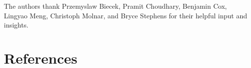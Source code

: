 \documentclass{article}
\begin{document}
The authors thank Przemyslaw Biecek, Pramit Choudhary, Benjamin Cox, Lingyao Meng, Christoph Molnar, and Bryce Stephens for their helpful input and insights. 

\section*{References}
\small


\end{document}
